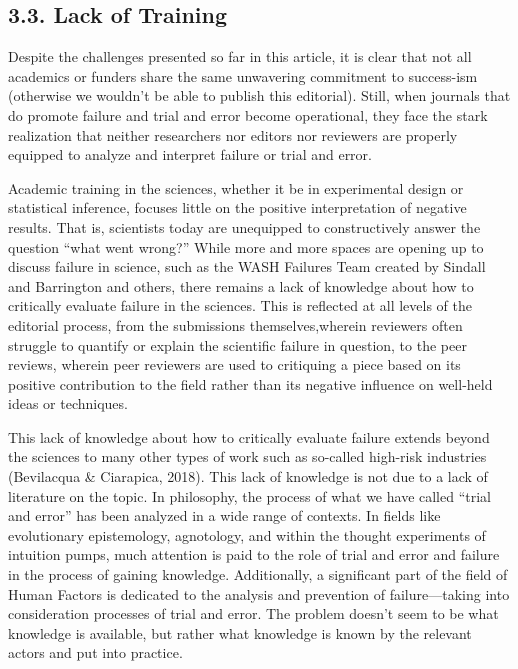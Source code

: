 \documentclass[empirical, author-date]{jote-article}
\begin{document}
\subsection{3.3. Lack of Training }

\textbf{}Despite the challenges presented so far in this article, it is clear that not all academics or funders share the same unwavering commitment to success-ism (otherwise we wouldn't be able to publish this editorial). Still, when journals that do promote failure and trial and error become operational, they face the stark realization that neither researchers nor editors nor reviewers are properly equipped to analyze and interpret failure or trial and error. 

Academic training in the sciences, whether it be in experimental design or statistical inference, focuses little on the positive interpretation of negative results. That is, scientists today are unequipped to constructively answer the question “what went wrong?” While more and more spaces are opening up to discuss failure in science, such as the WASH Failures Team created by Sindall and Barrington and others, there remains a lack of knowledge about how to critically evaluate failure in the sciences. This is reflected at all levels of the editorial process, from the submissions themselves,wherein reviewers often struggle to quantify or explain the scientific failure in question, to the peer reviews, wherein peer reviewers are used to critiquing a piece based on its positive contribution to the field rather than its negative influence on well-held ideas or techniques. 

This lack of knowledge about how to critically evaluate failure extends beyond the sciences to many other types of work such as so-called high-risk industries (Bevilacqua \& Ciarapica, 2018). This lack of knowledge is not due to a lack of literature on the topic. In philosophy, the process of what we have called “trial and error” has been analyzed in a wide range of contexts. In fields like evolutionary epistemology, agnotology, and within the thought experiments of intuition pumps, much attention is paid to the role of trial and error and failure in the process of gaining knowledge. Additionally, a significant part of the field of Human Factors is dedicated to the analysis and prevention of failure—taking into consideration processes of trial and error. The problem doesn't seem to be what knowledge is available, but rather what knowledge is known by the relevant actors and put into practice. 
\end{document}
